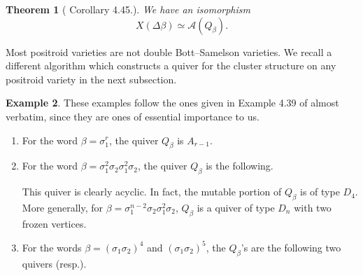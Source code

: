 \documentclass[11pt]{amsart}
\newtheorem{thm}{Theorem}[section]
\theoremstyle{definition}
\newtheorem{exmp}[thm]{Example}
\theoremstyle{remark}
\numberwithin{equation}{section}
\begin{document}
\begin{thm}[\cite{CGGLSS} Corollary 4.45.]
    We have an isomorphism $$X(\Delta \beta) \simeq \mathcal{A}(Q_\beta).$$
\end{thm}

Most positroid varieties are not double Bott--Samelson varieties. We recall a different algorithm which constructs a quiver for the cluster structure on any positroid variety in the next subsection.

\begin{exmp}
These examples follow the ones given in Example 4.39 of \cite{castronovo2024cluster} almost verbatim, since they are ones of essential importance to us.

\begin{enumerate}
    \item For the word $\beta = \sigma_1^r$, the quiver $Q_{\beta}$ is $A_{r-1}$.

    \item For the word $\beta = \sigma_1^{2}\sigma_2\sigma_1^{2}\sigma_2$, the quiver $Q_{\beta}$ is the following.

\begin{center}
\end{center}
This quiver is clearly acyclic. In fact, the mutable portion of $Q_\beta$ is of type $D_4$. More generally, for $\beta = \sigma_1^{n-2}\sigma_2\sigma_1^{2}\sigma_2$, $Q_{\beta}$ is a quiver of type $D_n$ with two frozen vertices.

\item For the words $\beta = (\sigma_1\sigma_2)^{4}$ and $(\sigma_1\sigma_2)^{5}$, the $Q_{\beta}$'s are the following two quivers (resp.).
\begin{center}
\end{center}
\end{enumerate}
\end{exmp}
\end{document}

